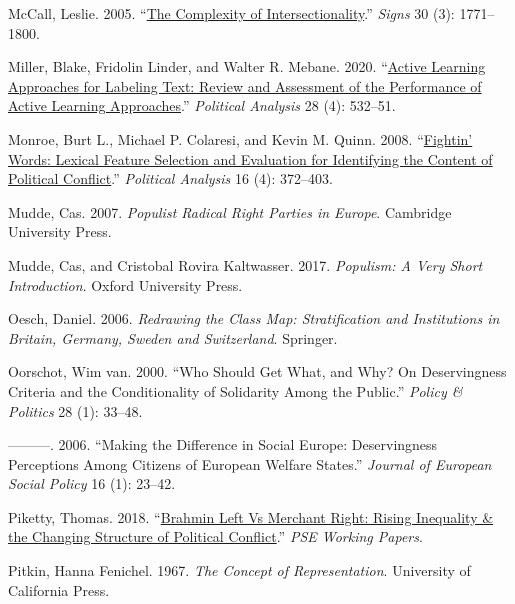 \documentclass[12pt]{article}
\begin{document}
\begin{CSLReferences}{1}{0}
McCall, Leslie. 2005. {``\href{https://doi.org/10.1086/426800}{The Complexity of Intersectionality}.''} \emph{Signs} 30 (3): 1771--1800.

Miller, Blake, Fridolin Linder, and Walter R. Mebane. 2020. {``\href{https://doi.org/10.1017/pan.2020.4}{Active Learning Approaches for Labeling Text: Review and Assessment of the Performance of Active Learning Approaches}.''} \emph{Political Analysis} 28 (4): 532--51.

Monroe, Burt L., Michael P. Colaresi, and Kevin M. Quinn. 2008. {``\href{https://doi.org/10.1093/pan/mpn018}{Fightin' Words: Lexical Feature Selection and Evaluation for Identifying the Content of Political Conflict}.''} \emph{Political Analysis} 16 (4): 372--403.

Mudde, Cas. 2007. \emph{Populist Radical Right Parties in Europe}. Cambridge University Press.

Mudde, Cas, and Cristobal Rovira Kaltwasser. 2017. \emph{Populism: A Very Short Introduction}. Oxford University Press.

Oesch, Daniel. 2006. \emph{Redrawing the Class Map: Stratification and Institutions in Britain, Germany, Sweden and Switzerland}. Springer.

Oorschot, Wim van. 2000. {``Who Should Get What, and Why? On Deservingness Criteria and the Conditionality of Solidarity Among the Public.''} \emph{Policy \& Politics} 28 (1): 33--48.

---------. 2006. {``Making the Difference in Social Europe: Deservingness Perceptions Among Citizens of European Welfare States.''} \emph{Journal of European Social Policy} 16 (1): 23--42.

Piketty, Thomas. 2018. {``\href{https://ideas.repec.org//p/hal/psewpa/hal-02878211.html}{Brahmin Left Vs Merchant Right: Rising Inequality \& the Changing Structure of Political Conflict}.''} \emph{{PSE} Working Papers}.

Pitkin, Hanna Fenichel. 1967. \emph{The Concept of Representation}. University of California Press.


\end{CSLReferences}
\end{document}
